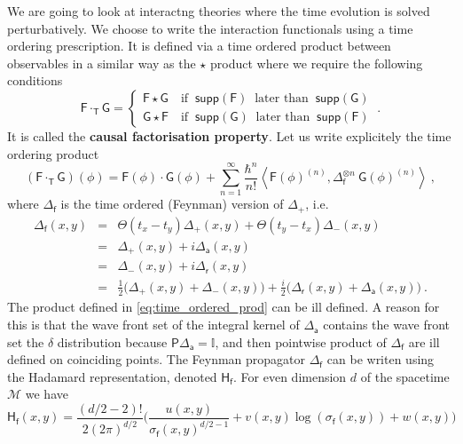 \documentclass[10pt]{book}
\newcommand{\supp}{\mathsf{supp}}
\newcommand{\sm}[1]{\left\langle#1\right\rangle}
\newcommand{\Mcal}{\mathcal{M}}
\newcommand{\Ibb}{\mathbb{I}}
\newcommand{\Fsf}{\mathsf{F}}
\newcommand{\Gsf}{\mathsf{G}}
\newcommand{\Hsf}{\mathsf{H}}
\newcommand{\Psf}{\mathsf{P}}
\newcommand{\Tsf}{\mathsf{T}}
\newcommand{\asf}{\mathsf{a}}
\newcommand{\fsf}{\mathsf{f}}
\newcommand{\rsf}{\mathsf{r}}
\theoremstyle{break}
\begin{document}
We are going to look at interactng theories where the time evolution is solved perturbatively. We choose to write the interaction functionals using a time ordering prescription. It is defined via a time ordered product between observables in a similar way as the $\star$ product where we require the following conditions
%
\begin{equation*}
\Fsf \cdot_\Tsf \Gsf = 
\left\{
\begin{array}{ll}
\Fsf \star \Gsf \quad \mbox{if } \ \supp(\Fsf) \ \mbox{ later than  } \ \supp(\Gsf)  \\
\Gsf \star \Fsf \quad \mbox{if } \ \supp(\Gsf) \ \mbox{ later than  } \ \supp(\Fsf) 
\end{array}
\right. \ .
\end{equation*}
%
It is called the \textbf{causal factorisation property}. Let us write explicitely the time ordering product
%
\begin{equation}
(\Fsf \cdot_\Tsf  \Gsf)(\phi) = \Fsf(\phi) \cdot \Gsf(\phi) + \sum_{n=1}^\infty \frac{\hbar^n}{n!} \sm{ \Fsf(\phi)^{(n)} , \Delta_\fsf^{\otimes n} \ \Gsf(\phi)^{(n)} } \ ,
\label{eq:time_ordered_prod}
\end{equation}
%
where $\Delta_\fsf$ is the time ordered (Feynman) version of $\Delta_+$, i.e.
%
\begin{eqnarray*}
\Delta_\fsf(x,y) &=& \Theta(t_x-t_y) \Delta_+(x,y) + \Theta(t_y-t_x) \Delta_-(x,y) \\
&=& \Delta_+(x,y) + i \Delta_\asf(x,y) \\
&=& \Delta_-(x,y) + i \Delta_\rsf(x,y) \\
&=& \frac12 \bigg( \Delta_+(x,y) + \Delta_-(x,y) \bigg) + \frac{i}{2} \bigg(\Delta_\rsf(x,y) + \Delta_\asf(x,y) \bigg) \ .
\end{eqnarray*}
%
The product defined in \eqref{eq:time_ordered_prod} can be ill defined. A reason for
this is that the wave front set of the integral kernel of $\Delta_\asf$ contains the wave front set the $\delta$ distribution because $\Psf \Delta_\asf = \Ibb$, and then pointwise product of $\Delta_\fsf$ are ill defined on coinciding points. The Feynman propagator $\Delta_\fsf$ can be writen using the Hadamard representation, denoted $\Hsf_\fsf$. For even dimension $d$ of the spacetime $\Mcal$ we have
%
\begin{equation*}
\Hsf_\fsf(x,y) = \frac{(d/2-2)!}{2(2\pi)^{d/2}} \bigg( \frac{u(x,y)}{\sigma_\fsf(x,y)^{d/2-1}} + v(x,y) \log\left( \sigma_\fsf(x,y) \right) + w(x,y) \bigg) 
\end{equation*}
\end{document}

